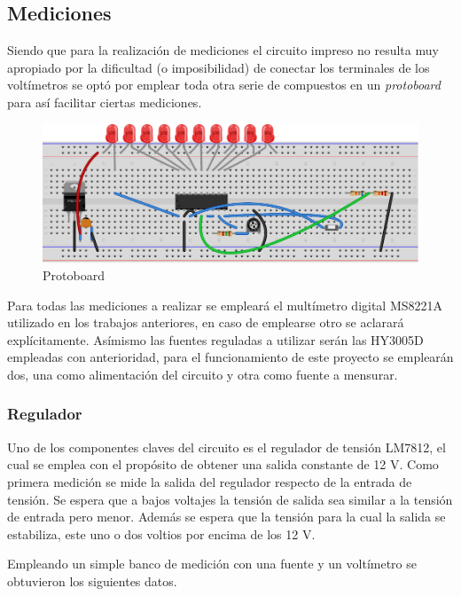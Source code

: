 \documentclass[12pt,a4paper]{article}
\begin{document}
		\subsection{Mediciones}

			Siendo que para la realización de mediciones el circuito impreso no resulta muy apropiado por la dificultad (o imposibilidad) de conectar los terminales de los voltímetros se optó por emplear toda otra serie de compuestos en un \textit{protoboard} para así facilitar ciertas mediciones.

			\begin{figure}[H]
			\centering
				\includegraphics[scale=1]{images/proto.pdf}\caption{Protoboard}\label{fig:proto}
			\end{figure}

			Para todas las mediciones a realizar se empleará el multímetro digital MS8221A utilizado en los trabajos anteriores, en caso de emplearse otro se aclarará explícitamente. Asímismo las fuentes reguladas a utilizar serán las HY3005D empleadas con anterioridad, para el funcionamiento de este proyecto se emplearán dos, una como alimentación del circuito y otra como fuente a mensurar.

			\subsubsection{Regulador}

			Uno de los componentes claves del circuito es el regulador de tensión LM7812, el cual se emplea con el propósito de obtener una salida constante de 12 V. Como primera medición se mide la salida del regulador respecto de la entrada de tensión. Se espera que a bajos voltajes la tensión de salida sea similar a la tensión de entrada pero menor. Además se espera que la tensión para la cual la salida se estabiliza, este uno o dos voltios por encima de los 12 V.

			Empleando un simple banco de medición con una fuente y un voltímetro se obtuvieron los siguientes datos.
\end{document}
